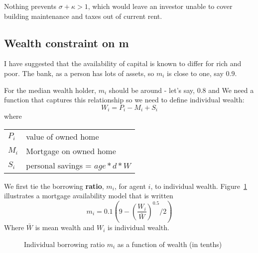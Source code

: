 Nothing prevents $\sigma+\kappa >1$, which would leave an investor unable to cover building maintenance and taxes out of current rent. 



\subsection{Wealth constraint on m} \label{SS:MWealthConstraint}


I have suggested that the availability of  capital is known to differ for rich and poor. 
The bank, as a person has lots of assets, so $m_i$ is close to one, say 0.9. 

For the median wealth holder, $m_i$ should be around - let's say, 0.8 and  
We need a function that captures this relationship so we need to define individual wealth:
\[W_i= P_i -M_i  +S_i\]
where 

\begin{tabular}{ll}
$P_i$ & value of owned home\\
$M_i$ & Mortgage on owned home\\
$S_i$ & personal savings = $age*d*W$\\
\end{tabular}


We first tie the borrowing \textbf{ratio}, $m_i$,  for agent $i$, to individual wealth. Figure~\ref{Fig:Borrowingratio} illustrates a mortgage availability  model that is written 
 \[ m_i = 0.1(9-\left(\frac{W_i}{\bar W}\right)^{0.5}/2 )\]
Where $\bar{W}$ is mean wealth and $W_i$ is individual wealth. 

\begin{figure}[htb]
\caption{Individual borrowing ratio $m_i$ as a function of wealth (in tenths)}
 \label{Fig:Borrowingratio}
\end{figure}


